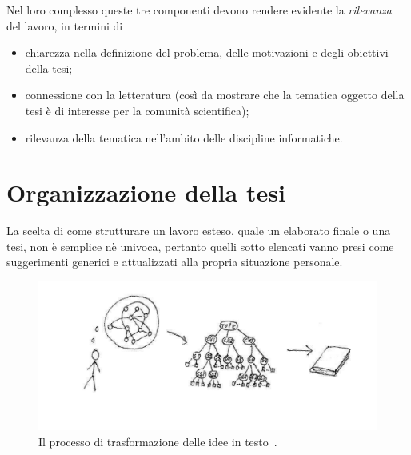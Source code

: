 \documentclass[12pt]{report}
\begin{document}
Nel loro complesso queste tre componenti devono rendere evidente la {\em rilevanza} del lavoro, in termini di
\begin{itemize}
\item chiarezza nella definizione del problema, delle motivazioni e degli obiettivi della tesi; 
\item connessione con la letteratura (cos\`i da mostrare che la tematica oggetto della tesi \`e di interesse per la comunit\`a scientifica);
\item rilevanza della tematica nell'ambito delle discipline informatiche.
\end{itemize}


\section{Organizzazione della tesi}
\label{sec:organizzazione}

La scelta di come strutturare un lavoro esteso, quale un elaborato finale o una tesi, non è semplice n\`{e} univoca, pertanto quelli sotto elencati vanno presi come suggerimenti generici e attualizzati alla propria situazione personale.

\begin{figure}[t]
	\centering
	\includegraphics[width = 150mm, trim={0 25mm 0 0}, clip]{immagini/ideas2text}
	\caption{Il processo di trasformazione delle idee in testo~\cite{hamalainen2019web}.}
	\label{fig:ideas2text}
\end{figure}
\end{document}

